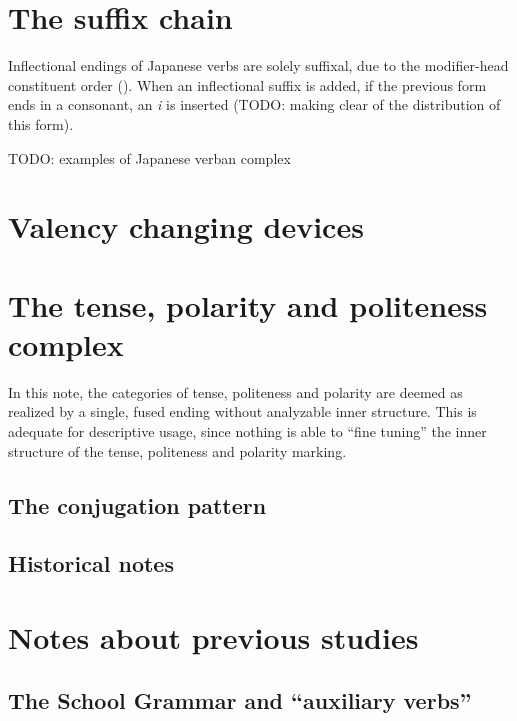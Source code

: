 \documentclass[UTF8, a4paper, oneside, scheme=plain]{ctexrep}
\newcommand{\corpus}[1]{\emph{#1}}
\begin{document}
\section{The suffix chain}

Inflectional endings of Japanese verbs are solely suffixal, 
due to the modifier-head constituent order ().
When an inflectional suffix is added,
if the previous form ends in a consonant,
an \corpus{i} is inserted (TODO: making clear of the distribution of this form).

\begin{exe}
    \ex TODO: examples of Japanese verban complex
\end{exe}

\section{Valency changing devices}

\section{The tense, polarity and politeness complex}\label{sec:tense-polarity-polite}

In this note,
the categories of tense, politeness and polarity 
are deemed as realized by a single, fused ending without analyzable inner structure.
This is adequate for descriptive usage,
since nothing is able to ``fine tuning'' the inner structure of the 
tense, politeness and polarity marking.

\subsection{The conjugation pattern}\label{sec:final-conjugation-pattern}



\subsection{Historical notes}

\section{Notes about previous studies}\label{sec:verb-complex-previous}

\subsection{The School Grammar and ``auxiliary verbs''}\label{sec:so-called-auxiliary-verb}
\end{document}
